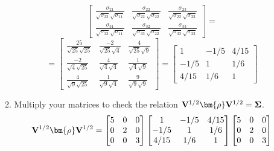 \begin{enumerate}[font=\bfseries]
\begin{enumerate}
\[\begin{bmatrix}
                    \frac{\sigma_{21}}{\sqrt{\sigma_{22}}\sqrt{\sigma_{11}}} & \frac{\sigma_{22}}{\sqrt{\sigma_{22}}\sqrt{\sigma_{22}}} & \frac{\sigma_{23}}{\sqrt{\sigma_{22}}\sqrt{\sigma_{33}}} \\
                    \frac{\sigma_{31}}{\sqrt{\sigma_{33}}\sqrt{\sigma_{11}}} & \frac{\sigma_{32}}{\sqrt{\sigma_{33}}\sqrt{\sigma_{22}}} & \frac{\sigma_{33}}{\sqrt{\sigma_{33}}\sqrt{\sigma_{33}}}
                \end{bmatrix}
                =
            \]
            \[
                =
                \begin{bmatrix}
                    \frac{25}{\sqrt{25}\sqrt{25}} & \frac{-2}{\sqrt{25}\sqrt{4}} & \frac{4}{\sqrt{25}\sqrt{9}} \\
                    \frac{-2}{\sqrt{4}\sqrt{25}} & \frac{4}{\sqrt{4}\sqrt{4}} & \frac{1}{\sqrt{4}\sqrt{9}} \\
                    \frac{4}{\sqrt{9}\sqrt{25}} & \frac{1}{\sqrt{9}\sqrt{4}} & \frac{9}{\sqrt{9}\sqrt{9}}
                \end{bmatrix}
                =
                \begin{bmatrix}
                    1 & -1/5 & 4/15 \\
                    -1/5 & 1 & 1/6 \\
                    4/15 & 1/6 & 1
                \end{bmatrix}
            \]
            \item Multiply your matrices to check the relation $\bold{V}^{1/2}\bm{\rho}\bold{V}^{1/2} = \bold{\Sigma}$.
            \[
                \bold{V}^{1/2}\bm{\rho}\bold{V}^{1/2} 
                = 
                \begin{bmatrix}
                5 & 0 & 0 \\
                0 & 2 & 0 \\
                0 & 0 & 3   
                \end{bmatrix}
                \begin{bmatrix}
                    1 & -1/5 & 4/15 \\
                    -1/5 & 1 & 1/6 \\
                    4/15 & 1/6 & 1
                \end{bmatrix}
                \begin{bmatrix}
                    5 & 0 & 0 \\
                    0 & 2 & 0 \\
                    0 & 0 & 3   

\end{bmatrix}\]
\end{enumerate}
\end{enumerate}

